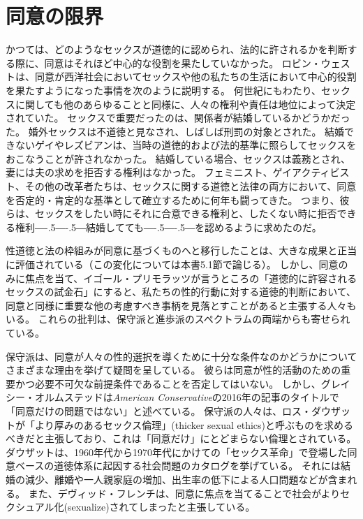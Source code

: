 \documentclass[paper=a4,book,openany]{jlreq}
\newcommand{\ig}[1]{}           %
\def\DDASH{―\kern-.5\zw―\kern-.5\zw―} %
\begin{document}
\section{同意の限界}

かつては、どのようなセックスが道徳的に認められ、法的に許されるかを判断する際に、同意はそれほど中心的な役割を果たしていなかった。
ロビン・ウェスト\ig{Robin West}は、同意が西洋社会においてセックスや他の私たちの生活において中心的役割を果たすようになった事情を次のように説明する。
何世紀にもわたり、セックスに関しても他のあらゆることと同様に、人々の権利や責任は地位によって決定されていた。
セックスで重要だったのは、関係者が結婚しているかどうかだった。
婚外セックスは不道徳と見なされ、しばしば刑罰の対象とされた。
結婚できないゲイやレズビアンは、当時の道徳的および法的基準に照らしてセックスをおこなうことが許されなかった\citep[p.7]{west20:_consen_legit_dysph}。
結婚している場合、セックスは義務とされ、妻には夫の求めを拒否する権利はなかった。
フェミニスト、ゲイアクティビスト、その他の改革者たちは、セックスに関する道徳と法律の両方において、同意を否定的・肯定的な基準として確立するために何年も闘ってきた。
つまり、彼らは、セックスをしたい時にそれに合意できる権利と、したくない時に拒否できる権利{\DDASH}結婚してても{\DDASH}を認めるように求めたのだ。

性道徳と法の枠組みが同意に基づくものへと移行したことは、大きな成果と正当に評価されている（この変化については本書5.1節で論じる）。
しかし、同意のみに焦点を当て、イゴール・プリモラッツが言うところの「道徳的に許容されるセックスの試金石」\citep{primoratz01:_sexual_moral}にすると、私たちの性的行動に対する道徳的判断において、同意と同様に重要な他の考慮すべき事柄を見落とすことがあると主張する人々もいる。
これらの批判は、保守派と進歩派のスペクトラムの両端からも寄せられている。

保守派は、同意が人々の性的選択を導くために十分な条件なのかどうかについてさまざまな理由を挙げて疑問を呈している。
彼らは同意が性的活動のための重要かつ必要不可欠な前提条件であることを否定してはいない。
しかし、グレイシー・オルムステッドは\emph{American Conservative}の2016年の記事のタイトルで「同意だけの問題ではない」と述べている\citep{olmstead16:_its_not_just_consen}。
保守派の人々は、ロス・ダウザットが「より厚みのあるセックス倫理」(thicker sexual ethics)と呼ぶものを求めるべきだと主張しており、これは「同意だけ」にとどまらない倫理とされている\citep{douthat17:_age_consen_its_discon}。
ダウザットは、1960年代から1970年代にかけての「セックス革命」で登場した同意ベースの道徳体系に起因する社会問題のカタログを挙げている。
それには結婚の減少、離婚や一人親家庭の増加、出生率の低下による人口問題などが含まれる。
また、デヴィッド・フレンチ\ig{David French}は、同意に焦点を当てることで社会がよりセクシュアル化(sexualize)されてしまったと主張している。
\end{document}
